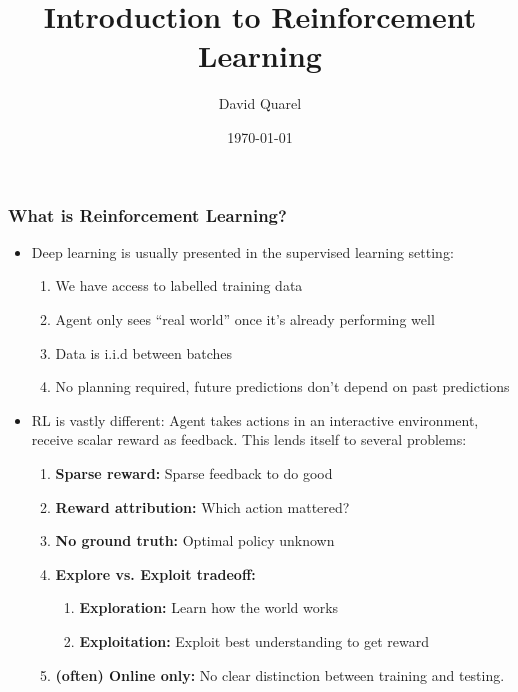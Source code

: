 \documentclass[10pt,a4paper]{beamer}
\begin{document}
\title[Introduction to Reinforcement Learning] %
{Introduction to Reinforcement Learning }

 
\author[David Quarel] %
{David Quarel}
 
 
\date[\today] %
{\today}
 
\frame{\titlepage}

\begin{frame}
\frametitle{What is Reinforcement Learning?}
\begin{itemize}
	\item Deep learning is usually presented in the supervised learning setting:
	\begin{enumerate} 
		\item We have access to labelled training data
		\item  Agent only sees ``real world'' once it's already performing well 
		\item Data is i.i.d between batches 
		\item No planning required, future predictions don't depend on past
		predictions
	\end{enumerate}  
	\pause
	\item RL is vastly different: Agent takes actions in an interactive environment,
	receive scalar reward as feedback. This lends itself to several problems:
	\begin{enumerate}
		\item  \textbf{Sparse reward:} Sparse feedback to do good

		\item \textbf{Reward attribution:} Which action mattered?

		\item \textbf{No ground truth:} Optimal policy unknown

		\item \textbf{Explore vs. Exploit tradeoff:}
		\begin{enumerate}
			\item \textbf{Exploration:} Learn how the world works
			\item \textbf{Exploitation:} Exploit best understanding to get reward
		\end{enumerate} 
	\item \textbf{(often) Online only:} No clear distinction between training and testing.
	\end{enumerate} 
\end{itemize}
	
\end{frame}
\end{document}
